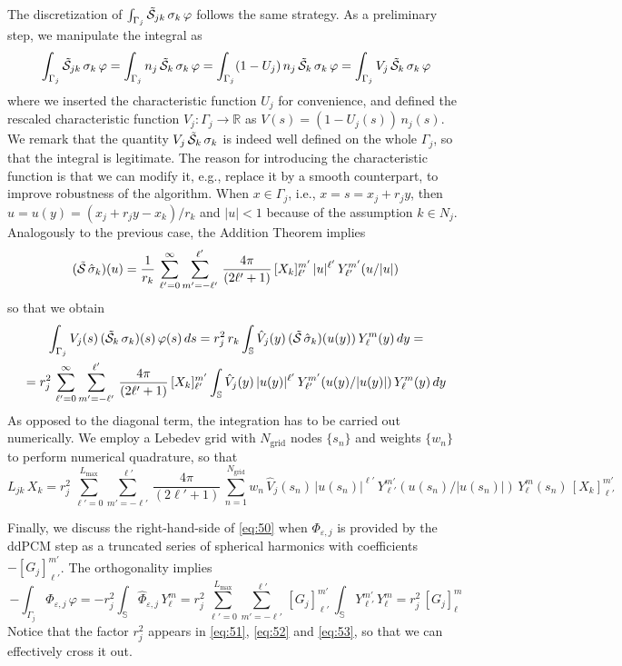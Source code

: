 The discretization of $\int_{\Gamma_j} \tilde{\mathcal{S}}_{jk} \, \sigma_k \, \varphi $ follows the same strategy. As a preliminary step, we manipulate the integral as
\[
\int_{\Gamma_j} \tilde{\mathcal{S}}_{jk} \, \sigma_k \, \varphi =\int_{\Gamma_j} n_j \, \tilde{\mathcal{S}}_{k} \, \sigma_k \, \varphi = \int_{\Gamma_j} (1 - U_j ) \,n_j \, \tilde{\mathcal{S}}_{k} \, \sigma_k \, \varphi = \int_{\Gamma_j} V_j \, \tilde{\mathcal{S}}_{k} \, \sigma_k \, \varphi
\]
where we inserted the characteristic function $U_j$ for convenience, and defined the rescaled characteristic function $V_j : \Gamma_j \to \mathbb{R}$ as $V(s) = (1 - U_j(s)) \, n_j(s)$. We remark that the quantity $V_j \, \tilde{\mathcal{S}}_{k} \, \sigma_k $ is indeed well defined on the whole $\Gamma_j$, so that the integral is legitimate. The reason for introducing the characteristic function is that we can modify it, e.g., replace it by a smooth counterpart, to improve robustness of the algorithm. When $x \in \Gamma_j$, i.e., $x = s = x_j + r_j y$, then $u = u(y) = (x_j + r_j y -x_k)/r_k$ and $|u| < 1$ because of the assumption $k \in N_j$. Analogously to the previous case, the Addition Theorem implies
\[
(\tilde{\mathcal{S}} \, \hat{\sigma}_k)(u) = \frac{1}{r_k} \, \sum_{\ell'= 0}^{\infty} \sum_{m' = -\ell'}^{\ell'} \, \frac{4\pi}{(2\ell' + 1)}\, [X_k]_{\ell'}^{m'} \, |u|^{\ell'} \, Y_{\ell'}^{m'}(u/|u|)
\]
so that we obtain
\begin{multline*}
\int_{\Gamma_j} V_j(s) \, (\tilde{\mathcal{S}}_{k} \, \sigma_k)(s) \, \varphi(s) \, ds =  r_j^2 \,r_k \int_\mathbb{S} \hat{V}_j(y) \, (\tilde{\mathcal{S}} \, \hat{\sigma}_k)(u(y)) \, Y_\ell^m(y) \, dy = \\
= r_j^2 \, \sum_{\ell'= 0}^{\infty} \sum_{m' = -\ell'}^{\ell'} \, \frac{4\pi}{(2\ell' + 1)}\, [X_k]_{\ell'}^{m'} \int_\mathbb{S} \hat{V}_j(y) \, |u(y)|^{\ell'} \, Y_{\ell'}^{m'}(u(y)/|u(y)|) \, Y_\ell^m(y) \, dy
\end{multline*}
As opposed to the diagonal term, the integration has to be carried out numerically. We employ a Lebedev grid with $N_\text{grid}$ nodes $\{s_n\}$ and weights $\{ w_n \}$ to perform numerical quadrature, so that
\begin{equation}\label{eq:52}
L_{jk} \, X_k = r_j^2 \, \sum_{\ell'= 0}^{L_\text{max}}  \sum_{m' = -\ell'}^{\ell'} \, \frac{4\pi}{(2\ell' + 1)}\, \sum_{n = 1}^{N_\text{grid}} w_n \, \hat{V}_j(s_n) \, |u(s_n)|^{\ell'} \, Y_{\ell'}^{m'}(u(s_n)/|u(s_n)|) \, Y_\ell^m(s_n)\, [X_k]_{\ell'}^{m'}  
\end{equation}

Finally, we discuss the right-hand-side of \eqref{eq:50} when $\Phi_{\varepsilon,j}$ is provided by the ddPCM step as a truncated series of spherical harmonics with coefficients $-[G_j]_{\ell'}^{m'}$. The orthogonality implies
\begin{equation}\label{eq:53}
-\int_{\Gamma_j} \Phi_{\varepsilon,j} \, \varphi =  - r_j^2 \int_\mathbb{S} \hat{\Phi}_{\varepsilon,j} \, Y_\ell^m = r_j^2 \,  \sum_{\ell'= 0}^{L_\text{max}} \sum_{m' = -\ell'}^{\ell'} \, [G_j]_{\ell'}^{m'} \,  \int_{\mathbb{S}}  Y_{\ell'}^{m'} \, Y_\ell^m = r_j^2 \, [G_j]_\ell^m
\end{equation}
Notice that the factor $r_j^2$ appears in \eqref{eq:51}, \eqref{eq:52} and \eqref{eq:53}, so that we can effectively cross it out.